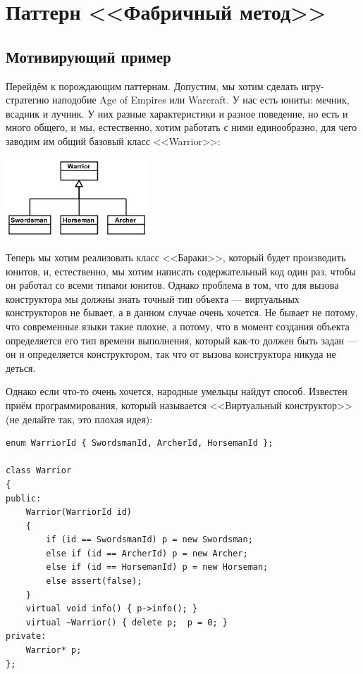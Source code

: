 \documentclass{../../text-style}
\begin{document}
\maketitle
\thispagestyle{empty}

\section{Паттерн <<Фабричный метод>>}

\subsection{Мотивирующий пример}

Перейдём к порождающим паттернам. Допустим, мы хотим сделать игру-стратегию наподобие Age of Empires или Warcraft. У нас есть юниты: мечник, всадник и лучник. У них разные характеристики и разное поведение, но есть и много общего, и мы, естественно, хотим работать с ними единообразно, для чего заводим им общий базовый класс <<Warrior>>:

\begin{center}
    \includegraphics[width=0.4\textwidth]{warriors.png}
\end{center}

Теперь мы хотим реализовать класс <<Бараки>>, который будет производить юнитов, и, естественно, мы хотим написать содержательный код один раз, чтобы он работал со всеми типами юнитов. Однако проблема в том, что для вызова конструктора мы должны знать точный тип объекта --- виртуальных конструкторов не бывает, а в данном случае очень хочется. Не бывает не потому, что современные языки такие плохие, а потому, что в момент создания объекта определяется его тип времени выполнения, который как-то должен быть задан --- он и определяется конструктором, так что от вызова конструктора никуда не деться.

Однако если что-то очень хочется, народные умельцы найдут способ. Известен приём программирования, который называется <<Виртуальный конструктор>> (не делайте так, это плохая идея):

\begin{verbatim}
enum WarriorId { SwordsmanId, ArcherId, HorsemanId };

class Warrior
{
public:  
    Warrior(WarriorId id)
    {
        if (id == SwordsmanId) p = new Swordsman;
        else if (id == ArcherId) p = new Archer;
        else if (id == HorsemanId) p = new Horseman;
        else assert(false);
    }
    virtual void info() { p->info(); }
    virtual ~Warrior() { delete p;  p = 0; }
private:
    Warrior* p;
};
\end{verbatim}
\end{document}
